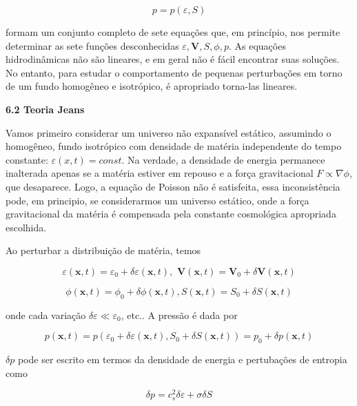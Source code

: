 \documentclass[a4paper,12pt]{article}
\begin{document}
\begin{equation}\label{eq11}
	p= p(\varepsilon , S)
\end{equation}

formam um conjunto completo de sete equações que, em princípio, nos permite determinar
as sete funções desconhecidas $\varepsilon, \textbf{V}, S, \phi, p$. As equações hidrodinâmicas  não são lineares, e em geral não é fácil encontrar suas soluções. No entanto, para estudar o comportamento de pequenas perturbações em torno de um fundo homogêneo e isotrópico, é apropriado torna-las lineares.

\begin{center}	
	\textbf{6.2 Teoria Jeans}
\end{center}

Vamos primeiro considerar um universo não expansível estático, assumindo o homogêneo,
fundo isotrópico com densidade de matéria independente do tempo constante: $\varepsilon (x,t)= const$. Na verdade, a densidade de energia permanece inalterada apenas se a matéria estiver em repouso e a força gravitacional $F \propto\nabla\phi$, que desaparece. Logo, a equação de Poisson não é satisfeita, essa inconsistência pode, em principio, se considerarmos um universo estático, onde a força gravitacional da matéria é compensada pela constante cosmológica apropriada escolhida.

Ao perturbar a distribuição de matéria, temos

\begin{equation}\label{eq12}
	\varepsilon (\textbf{x},t) = \varepsilon_0 + \delta\varepsilon (\textbf{x},t),\,\, \textbf{V} (\textbf{x},t) = \textbf{V}_0 +\delta\textbf{V} (\textbf{x},t) 
\end{equation}

$$\phi (\textbf{x},t) = \phi_0 + \delta\phi (\textbf{x},t), S (\textbf{x},t)= S_0 + \delta S (\textbf{x},t)$$

onde cada variação $\delta\varepsilon \ll \varepsilon_0$, etc..
\newline
A pressão é dada por

\begin{equation}\label{eq13}
	p (\textbf{x},t) = p( \varepsilon_0 + \delta\varepsilon (\textbf{x},t), S_0 + \delta S (\textbf{x},t) ) = p_0 +\delta p (\textbf{x},t) 
\end{equation}

$\delta p$ pode ser escrito em termos da densidade de energia e pertubações de entropia como

\begin{equation}\label{eq14}
	\delta p = c_s^2\delta\varepsilon + \sigma\delta S
\end{equation}
\end{document}
